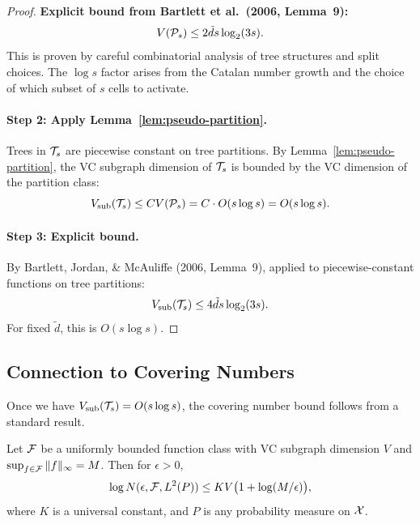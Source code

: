 \documentclass[12pt]{article}
\begin{document}
\begin{proof}
\textbf{Explicit bound from Bartlett et al.\ (2006, Lemma~9):}
\[
V(\mathcal{P}_s) \le 2\tilde{d} s \log_2(3s).
\]
This is proven by careful combinatorial analysis of tree structures and split choices. The $\log s$ factor arises from the Catalan number growth and the choice of which subset of $s$ cells to activate.

\paragraph{Step 2: Apply Lemma~\ref{lem:pseudo-partition}.}
Trees in $\mathcal{T}_s$ are piecewise constant on tree partitions. By Lemma~\ref{lem:pseudo-partition}, the VC subgraph dimension of $\mathcal{T}_s$ is bounded by the VC dimension of the partition class:
\[
V_{\text{sub}}(\mathcal{T}_s) \le C V(\mathcal{P}_s) = C \cdot O(s \log s) = O(s \log s).
\]

\paragraph{Step 3: Explicit bound.}
By Bartlett, Jordan, \& McAuliffe (2006, Lemma~9), applied to piecewise-constant functions on tree partitions:
\[
V_{\text{sub}}(\mathcal{T}_s) \le 4\tilde{d} s \log_2(3s).
\]
For fixed $\tilde{d}$, this is $O(s \log s)$.
\end{proof}

\subsection{Connection to Covering Numbers}

Once we have $V_{\text{sub}}(\mathcal{T}_s) = O(s \log s)$, the covering number bound follows from a standard result.

\begin{corollary}
\label{cor:covering-app}
Let $\mathcal{F}$ be a uniformly bounded function class with VC subgraph dimension $V$ and $\sup_{f \in \mathcal{F}} \|f\|_\infty = M$. Then for $\epsilon > 0$,
\[
\log N(\epsilon, \mathcal{F}, L^2(P)) \le K V \bigl( 1 + \log(M/\epsilon) \bigr),
\]
where $K$ is a universal constant, and $P$ is any probability measure on $\mathcal{X}$.
\end{corollary}
\end{document}
